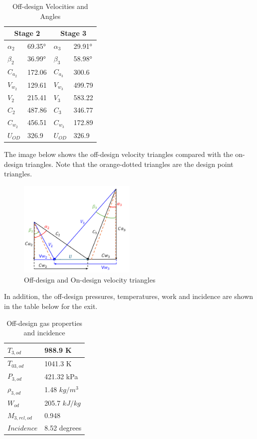 \documentclass[12pt, letter]{report}
\begin{document}
\begin{table}[H]
    \centering
    \caption{Off-design Velocities and Angles}
    \begin{tabular}{|l|l|l|l|} \hline
        \multicolumn{2}{|c|}{\textbf{Stage 2}} & \multicolumn{2}{c|}{\textbf{Stage 3}} \\ \hline
        $\alpha_2$ & 69.35° & $\alpha_3$ & 29.91° \\ \hline
        $\beta_2$ & 36.99° & $\beta_3$ & 58.98° \\ \hline
        $C_{a_2}$ & 172.06 & $C_{a_3}$ & 300.6 \\ \hline
        $V_{w_2}$ & 129.61 & $V_{w_3}$ & 499.79 \\ \hline
        $V_2$ & 215.41 & $V_3$ & 583.22 \\ \hline
        $C_2$ & 487.86 & $C_3$ & 346.77 \\ \hline
        $C_{w_2}$ & 456.51 & $C_{w_3}$ & 172.89 \\ \hline
        $U_{OD}$& 326.9 & $U_{OD}$& 326.9 \\ \hline
    \end{tabular}
\end{table}

The image below shows the off-design velocity triangles compared with the on-design triangles. Note that the orange-dotted triangles are the design point triangles. 

\begin{figure}[H]
\centering
\includegraphics[width=0.5\textwidth]{figures/od_triangles.png}
\caption{Off-design and On-design velocity triangles}
\end{figure}

In addition, the off-design pressures, temperatures, work and incidence are shown in the table below for the exit. 

\begin{table}[H]
\centering
\caption{Off-design gas properties and incidence}
\begin{tabular}{|l|l|}
\hline
$T_{3,od}$ & 988.9 K\\ \hline
$T_{03,od}$ & 1041.3 K\\ \hline
$P_{3,od}$ & 421.32 kPa\\ \hline
$\rho_{3,od}$ & 1.48 $kg/m^3$\\ \hline
$W_{od}$ & 205.7 $kJ/kg$\\ \hline
$M_{3,rel,od}$ & 0.948\\ \hline
$Incidence$ & 8.52 degrees\\ \hline
\end{tabular}
\end{table}
\end{document}
